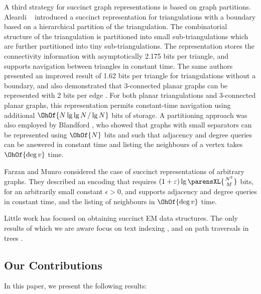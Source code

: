 A third strategy for succinct graph representations is based on graph
partitions.
Aleardi \etal~\cite{DBLP:conf/wads/AleardiDS05}
introduced a succinct representation for triangulations with a
boundary based on a hierarchical partition of the triangulation.
The combinatorial structure of the triangulation is partitioned into small
sub-triangulations which are further partitioned into tiny
sub-triangulations.
The representation stores the connectivity
information with asymptotically 2.175 bits per triangle, and supports
navigation between triangles in constant time.
The same authors presented an improved result of 1.62 bits per triangle for
triangulations without a boundary, and also demonstrated that
3-connected planar graphs can be represented with 2 bits per edge
\cite{DBLP:journals/tcs/AleardiDS08}.
For both planar triangulations and 3-connected planar graphs, this
representation permits constant-time navigation using additional
$\OhOf{N \lg \lg N \mathop{/} \lg N}$ bits of storage.
A partitioning approach was also
employed by Blandford \cite{DBLP:conf/soda/BlandfordBK03}, who showed
that graphs with small separators can be represented using $\OhOf{N}$
bits and such that adjacency and degree queries can be answered in
constant time and listing the neighbours of a vertex takes
$\OhOf{\deg{v}}$ time.

Farzan and Munro \cite{DBLP:conf/esa/FarzanM08} considered
the case of succinct representations of arbitrary graphs.
They described an encoding that requires
$(1 + \epsilon) \lg \parensXL{\genfrac{}{}{0pt}{}{N^2}{M}}$ bits,
for an arbitrarily small constant $\epsilon > 0$,
and supports adjacency and degree queries in constant
time, and the listing of neighbours in $\OhOf{\deg{v}}$ time.

Little work has focused on obtaining succinct EM data structures.
The only results of which we are aware focus on text indexing \cite{DBLP:conf/dcc/ChienHSV08,
  clark_96}, and on path traversals in trees \cite{DillabaughHM08}.

\subsection{Our Contributions}

In this paper, we present the following results:

